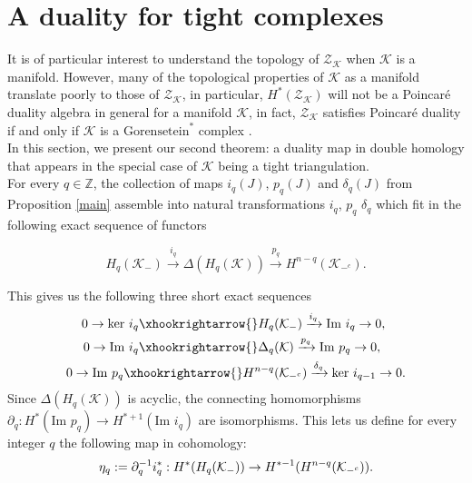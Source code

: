 \documentclass[a4paper]{amsart}
\theoremstyle{definition}
\def\Z{\mathbb{Z}}    %
\def\K{\mathcal{K}}
\def\ZZ{\mathcal{Z}}
\def\Z{\mathbb{Z}}
\def\ker{\text{ker }}
\def\im{\text{Im }}
\begin{document}
\section{A duality for tight complexes}
    It is of particular interest to understand the topology of $\ZZ_\K$ when $\K$ is a manifold. However, many of the topological properties of $\K$ as a manifold translate poorly to those of $\ZZ_\K$, in particular, $H^*(\ZZ_\K)$ will not be a Poincaré duality algebra in general for a manifold $\K$, in fact, $\ZZ_\K$ satisfies Poincaré duality if and only if $\K$ is a $\text{Gorensetein}^*$ complex \cite[Theorem 3.4.5]{cohen-mac-rings}.\\

    In this section, we present our second theorem: a duality map in double homology that appears in the special case of $\K$ being a tight triangulation.\\
    
    For every $q\in \Z$, the collection of maps $i_q(J)$, $p_q(J)$ and $\delta_q(J)$ from Proposition \ref{main} assemble into natural transformations $i_q$, $p_q$ $\delta_q$ which fit in the following exact sequence of functors
    
    \[H_q(\K_-)\xrightarrow{i_q}\Delta(H_q(\K))\xrightarrow{p_q}H^{n-q}(\K_{-^c}).\]

    This gives us the following three short exact sequences
    \begin{align}
        0\to \ker i_q\xhookrightarrow{} H_q&(\K_-)\xrightarrow{i_q} \im i_q\to 0,\\
        0\to \im i_q\xhookrightarrow{} \Delta_q&(\K)\xrightarrow{p_q} \im p_q\to 0,\\
        0\to \im p_q\xhookrightarrow{} H^{n-q}&(\K_{-^c})\xrightarrow{\delta_q} \ker i_{q-1}\to 0.
    \end{align}
Since $\Delta(H_q(\K))$ is acyclic, the connecting homomorphisms $\partial_{q}:H^{*}(\im p_q)\to H^{*+1}(\im i_q)$ are isomorphisms. This lets us define for every integer $q$ the following map in cohomology: \begin{equation}{\label{Etaq}}
    \eta_q:=\partial_q^{-1}i_q^*: H^*(H_q(\K_-))\to H^{*-1}(H^{n-q}(\K_{-^c})).
\end{equation}
\end{document}
